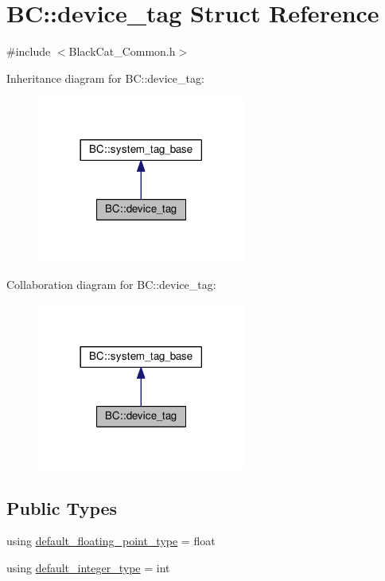 \hypertarget{structBC_1_1device__tag}{}\section{BC\+:\+:device\+\_\+tag Struct Reference}
\label{structBC_1_1device__tag}


{\ttfamily \#include $<$Black\+Cat\+\_\+\+Common.\+h$>$}



Inheritance diagram for BC\+:\+:device\+\_\+tag\+:
\nopagebreak
\begin{figure}[H]
\begin{center}
\leavevmode
\includegraphics[width=194pt]{structBC_1_1device__tag__inherit__graph}
\end{center}
\end{figure}


Collaboration diagram for BC\+:\+:device\+\_\+tag\+:
\nopagebreak
\begin{figure}[H]
\begin{center}
\leavevmode
\includegraphics[width=194pt]{structBC_1_1device__tag__coll__graph}
\end{center}
\end{figure}
\subsection*{Public Types}
\begin{DoxyCompactItemize}
\item 
using \hyperlink{structBC_1_1device__tag_a537fb7db04f78815f579f49afac5febf}{default\+\_\+floating\+\_\+point\+\_\+type} = float
\item 
using \hyperlink{structBC_1_1device__tag_a39fe8604bf94b5b66fd55137ddb91993}{default\+\_\+integer\+\_\+type} = int
\end{DoxyCompactItemize}


